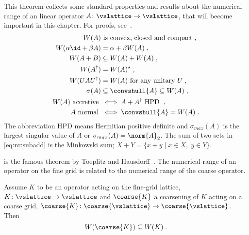 \begin{theorem} \label{thm:nr:properties}
This theorem collects some standard properties and results about the numerical range of an linear operator $A \colon \vslattice \rightarrow \vslattice$, that will become important in this chapter.
For proofs, see~\cite{gustafson1997numerical}.
\begin{align}
    W(A) &\text{ is convex, closed and compact} \;,                     \label{eq:nr:convex}    \\
    W(\alpha \id + \beta A) &= \alpha + \beta W(A) \;,                  \label{eq:nr:linear}    \\
    W(A + B) &\subseteq W(A) + W(A) \;,                                 \label{eq:nr:subadd}    \\
    W(A^{\dagger}) &= W(A)^{\star} \;,                                  \label{eq:nr:dagger}    \\
    W(U A U^{\dagger}) &= W(A) \text{ for any unitary $U$} \;,          \label{eq:nr:unitary}   \\
    \sigma(A) &\subseteq \convshull{A} \subseteq W(A) \;,               \label{eq:nr:convhull}  \\
    W(A) \text{ accretive } &\iff A+A^{\dagger} \text{ HPD } \;,        \label{eq:nr:accretive} \\
    A \text{ normal } &\iff \convshull{A} = W(A) \;.                    \label{eq:nr:normal}    %
\end{align}
The abbreviation HPD means Hermitian positive definite and $\sigma_{max}(A)$ is the largest singular value of $A$ or $\sigma_{max}(A) = \norm{A}_2$.
The sum of two sets in \cref{eq:nr:subadd} is the Minkowski sum; $X+Y = \{x+y \mid x \in X, \; y \in Y\}$.
\end{theorem}

 is the famous theorem by Toeplitz and Hausdorff~\cite{toeplitz1918algebraische,hausdorff1919wertvorrat}.
The numerical range of an operator on the fine grid is related to the numerical range of the coarse operator.

\begin{theorem} \label{thm:numerical:range}
Assume $K$ to be an operator acting on the fine-grid lattice, $K \colon \vslattice \rightarrow \vslattice$ and $\coarse{K}$ a coarsening of $K$ acting on a coarse grid, $\coarse{K} \colon \coarse{\vslattice} \rightarrow \coarse{\vslattice}$.
Then
\begin{equation}
W(\coarse{K}) \subseteq W(K) \;.
\end{equation}
\end{theorem}

